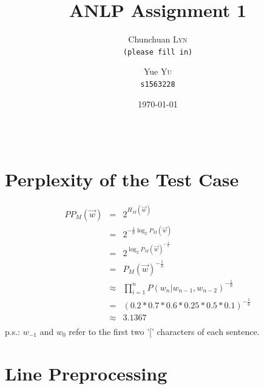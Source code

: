 \documentclass{article}
\title{ANLP Assignment 1} %
\author{
	Chunchuan \textsc{Lyn}\\
	\texttt{(please fill in)}
	\and
	Yue \textsc{Yu}\\
	\texttt{s1563228}
}
\date{\today} %
\begin{document}
\maketitle %

\begin{center}
\begin{tabular}{l r}
\end{tabular}
\end{center}


\section{Perplexity of the Test Case}
	
	\begin{eqnarray*}
	PP_M(\vec{w}) &=& 2^{H_M(\vec{w})}  \\
	&=& 2^{-\frac{1}{n} \log_2 P_M(\vec{w}) }  \\
	&=& 2^{\log_2 P_M(\vec{w})^{-\frac{1}{n}}} \\
	&=& P_M(\vec{w})^{-\frac{1}{n}} \\
	&\approx& {\prod_{i=1}^{n} P(w_n|w_{n-1},w_{n-2})}^{-\frac{1}{n}} \\
	&=& (0.2*0.7*0.6*0.25*0.5*0.1)^{-\frac{1}{6}} \\
	&\approx& 3.1367 \nonumber \\
	\end{eqnarray*}
	p.s.: $w_{-1}$ and $w_0$ refer to the first two {'['} characters of each sentence.

\section{Line Preprocessing}
\end{document}
